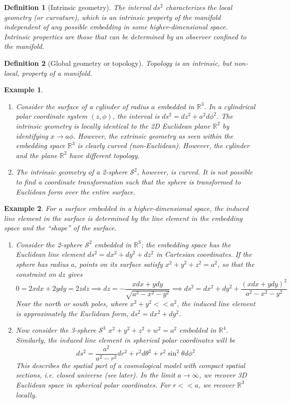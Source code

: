 \documentclass[a4paper]{article}
\newtheorem{eg}{Example}[section]
\theoremstyle{new}
\newtheorem{defi}{Definition}[section]
\begin{document}
\begin{defi}[Intrinsic geometry]
The interval $ds^2$ characterizes the local geometry (or curvature), which is an intrinsic property of the manifold independent of any possible embedding in some higher-dimensional space. Intrinsic properties are those that can be determined by an observer confined to the manifold.
\end{defi}
\begin{defi}[Global geometry or topology]
Topology is an intrinsic, but non-local, property of a manifold.
\end{defi}
\begin{eg}\leavevmode
\begin{enumerate}
\item Consider the surface of a cylinder of radius $a$ embedded in $\mathbb{R}^3$. In a cylindrical polar coordinate system $(z,\phi)$, the interval is $ds^2=dz^2+a^2d\phi^2$. The intrinsic geometry is locally identical to the 2D Euclidean plane $\mathbb{R}^2$ by identifying $x\rightarrow a\phi$. However, the extrinsic geometry as seen within the embedding space $\mathbb{R}^3$ is clearly curved (non-Euclidean). However, the cylinder and the plane $\mathbb{R}^2$ have different topology. 
\item The intrinsic geometry of a 2-sphere $\mathcal{S}^2$, however, is curved. It is not possible to find a coordinate transformation such that the sphere is transformed to Euclidean form over the entire surface.
\end{enumerate}
\end{eg}
\begin{eg}
For a surface embedded in a higher-dimensional space,
the induced line element in the surface is determined by the line element in the embedding space and the “shape” of the surface.
\begin{enumerate}
    \item Consider the 2-sphere $\mathcal{S}^2$ embedded in $\mathbb{R}^3$; the embedding space has the Euclidean line element $ds^2 = dx^2 + dy^2 +dz^2$ in Cartesian coordinates. If the sphere has radius $a$, points on its surface satisfy $x^2+y^2+z^2=a^2$, so that the constraint on $dz$ gives
    $$0=2xdx+2ydy=2zdz\implies dz=-\frac{xdx+ydy}{\sqrt{a^2-x^2-y^2}}\implies ds^2=dx^2+dy^2+\frac{(xdx+ydy)^2}{a^2-x^2-y^2}$$
    Near the north or south poles, where $x^2+y^2<<a^2$, the induced line element is approximately the Euclidean form, $ds^2=dx^2+dy^2$.
    \item Now consider the 3-sphere $\mathcal{S}^3$ $x^2+y^2+z^2+w^2=a^2$ embedded in $\mathbb{R}^4$. Similarly, the induced line element in spherical polar coordinates will be
    $$ds^2=\frac{a^2}{a^2-r^2}dr^2+r^2d\theta^2+r^2\sin^2\theta d\phi^2$$
    This describes the spatial part of a cosmological model with compact spatial sections, i.e. closed universe (see later). In the limit $a\rightarrow\infty$, we recover 3D Euclidean space in spherical polar coordinates. For $r<<a$, we recover $\mathbb{R}^3$ locally.
\end{enumerate}
\end{eg}
\end{document}
